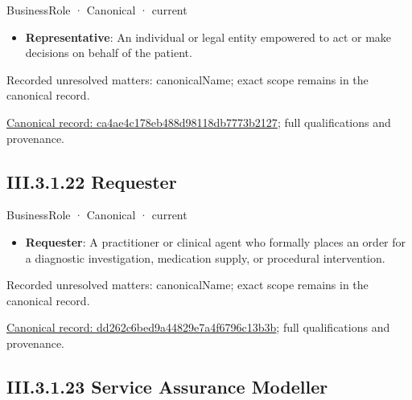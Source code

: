 \label{element:ca4ae4c178eb488d98118db7773b2127}
{\small BusinessRole · Canonical · current}\par

\begin{itemize}


\item \textbf{Representative}: An individual or legal entity empowered to act or make decisions on behalf of the patient.

\end{itemize}

{\small Recorded unresolved matters: canonicalName; exact scope remains in the canonical record.}\par
{\footnotesize \href{../../../../../../../continuum/business/business-role/ca4ae4c178eb488d98118db7773b2127.md}{Canonical record: ca4ae4c178eb488d98118db7773b2127}; full qualifications and provenance.}\par
\subsection*{III.3.1.22 Requester}
\label{navigation:III.3.1.22}

\label{element:dd262c6bed9a44829e7a4f6796c13b3b}
{\small BusinessRole · Canonical · current}\par

\begin{itemize}


\item \textbf{Requester}: A practitioner or clinical agent who formally places an order for a diagnostic investigation, medication supply, or procedural intervention.

\end{itemize}

{\small Recorded unresolved matters: canonicalName; exact scope remains in the canonical record.}\par
{\footnotesize \href{../../../../../../../continuum/business/business-role/dd262c6bed9a44829e7a4f6796c13b3b.md}{Canonical record: dd262c6bed9a44829e7a4f6796c13b3b}; full qualifications and provenance.}\par
\subsection*{III.3.1.23 Service Assurance Modeller}
\label{navigation:III.3.1.23}

